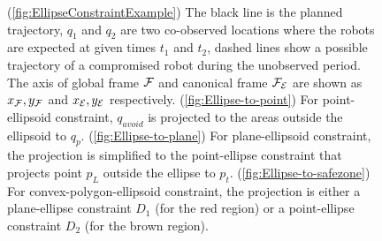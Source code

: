 \documentclass{article}
\newcommand{\news}{\color{blue}}
\begin{document}
\begin{figure}[H]
    \caption{\news (\ref{fig:EllipseConstraintExample}) The black line is the planned trajectory, $q_1$ and $q_2$ are two co-observed locations where the robots are expected at given times $t_1$ and $t_2$, dashed lines show a possible trajectory of a compromised robot during the unobserved period. The axis of global frame $\mathcal{F}$ and canonical frame $\mathcal{F}_{\mathcal{E}}$ are shown as $x_{\mathcal{F}}, y_{\mathcal{F}}$ and $x_{\mathcal{E}}, y_{\mathcal{E}}$ respectively. 
    (\ref{fig:Ellipse-to-point}) For point-ellipsoid constraint, $q_{avoid}$ is projected to the areas outside the ellipsoid to $q_{p}$. 
    (\ref{fig:Ellipse-to-plane}) For plane-ellipsoid constraint, the projection is simplified to the point-ellipse constraint that projects point $p_{L}$ outside the ellipse to $p_{t}$.
    (\ref{fig:Ellipse-to-safezone}) For convex-polygon-ellipsoid constraint, the projection is either a plane-ellipse constraint $D_{1}$ (for the red region) or a point-ellipse constraint $D_{2}$ (for the brown region).}
    \label{fig:Reachability_full}
  \end{figure}
\end{document}
